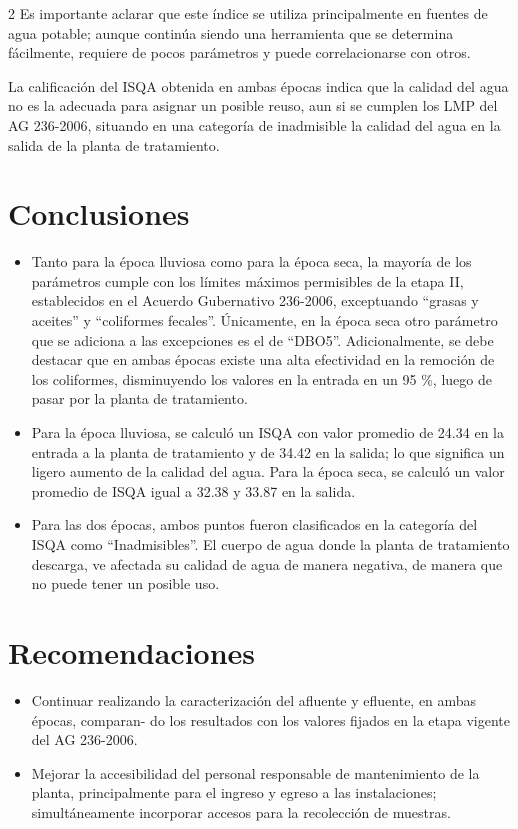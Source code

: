 \documentclass[12pt,spanish,Letterpaper,openany]{book}
\begin{document}
\begin {multicols}{2}
Es importante aclarar que este índice se utiliza principalmente en fuentes de agua potable; aunque continúa siendo una herramienta que se determina fácilmente, requiere de pocos parámetros y puede correlacionarse con otros.

La calificación del ISQA obtenida en ambas épocas indica que la calidad del agua no es la adecuada para asignar un posible reuso, aun si se cumplen los LMP del AG 236-2006, situando en una categoría de inadmisible la calidad del agua en la salida de la planta de tratamiento.

\hypertarget{conclusiones-5}{%
\section{Conclusiones}\label{conclusiones-5}}

\begin{itemize}
\item
  Tanto para la época lluviosa como para la época seca, la mayoría de los parámetros cumple con los límites máximos permisibles de la etapa II, establecidos en el Acuerdo Gubernativo 236-2006, exceptuando ``grasas y aceites'' y ``coliformes fecales''. Únicamente, en la época seca otro parámetro que se adiciona a las excepciones es el de ``DBO5''. Adicionalmente, se debe destacar que en ambas épocas existe una alta efectividad en la remoción de los coliformes, disminuyendo los valores en la entrada en un 95 \%, luego de pasar por la planta de tratamiento.
\item
  Para la época lluviosa, se calculó un ISQA con valor promedio de 24.34 en la entrada a la planta de tratamiento y de 34.42 en la salida; lo que significa un ligero aumento de la calidad del agua. Para la época seca, se calculó un valor promedio de ISQA igual a 32.38 y 33.87 en la salida.
\item
  Para las dos épocas, ambos puntos fueron clasificados en la categoría del ISQA como ``Inadmisibles''. El cuerpo de agua donde la planta de tratamiento descarga, ve afectada su calidad de agua de manera negativa, de manera que no puede tener un posible uso.
\end{itemize}

\hypertarget{recomendaciones-1}{%
\section{Recomendaciones}\label{recomendaciones-1}}

\begin{itemize}
\item
  Continuar realizando la caracterización del afluente y efluente, en ambas épocas, comparan-
  do los resultados con los valores fijados en la etapa vigente del AG 236-2006.
\item
  Mejorar la accesibilidad del personal responsable de mantenimiento de la planta, principalmente para el ingreso y egreso a las instalaciones; simultáneamente incorporar accesos para la recolección de muestras.
\end{itemize}


\end{multicols}
\end{document}

